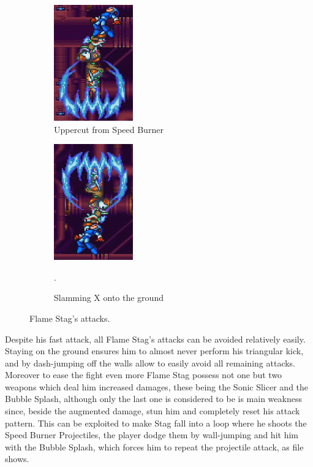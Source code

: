 \begin{figure}
	\ContinuedFloat
	\centering
	\begin{subfigure}[t]{0.4\linewidth}
		\centering
		\includegraphics[height=5cm]{figures/X2/Flame_stag/Stag_uppercut.png}
		\caption{Uppercut from Speed Burner}
	\end{subfigure}
	\begin{subfigure}[t]{0.4\linewidth}
		\centering
		\includegraphics[height=5cm]{figures/X2/Flame_stag/Stag_descend.png}
		\caption{Slamming X onto the ground}.
	\end{subfigure}
	\caption{Flame Stag's attacks.}
\end{figure}

Despite his fast attack, all Flame Stag's attacks can be avoided relatively easily. Staying on the ground ensures him to almost never perform his triangular kick, and by dash-jumping off the walls allow to easily avoid all remaining attacks. Moreover to ease the fight even more Flame Stag possess not one but two weapons which deal him increased damages, these being the Sonic Slicer and the Bubble Splash, although only the last one is considered to be is main weakness since, beside the augmented damage, stun him and completely reset his attack pattern. This can be exploited to make Stag fall into a loop where he shoots the Speed Burner Projectiles, the player dodge them by wall-jumping and hit him with the Bubble Splash, which forces him to repeat the projectile attack, as file  shows.


